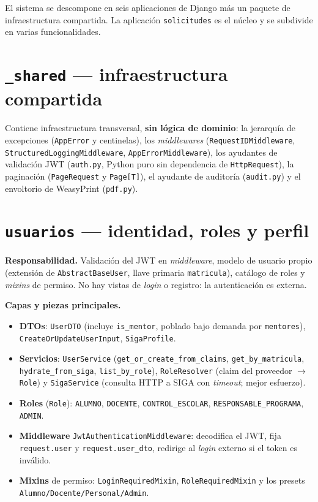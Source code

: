 \documentclass[12pt,letterpaper]{report}
\begin{document}
El sistema se descompone en seis aplicaciones de Django más un paquete de
infraestructura compartida. La aplicación \texttt{solicitudes} es el núcleo y se
subdivide en varias funcionalidades.

\section{\texttt{\_shared} — infraestructura compartida}

Contiene infraestructura transversal, \textbf{sin lógica de dominio}: la
jerarquía de excepciones (\texttt{AppError} y centinelas), los \textit{middlewares}
(\texttt{RequestIDMiddleware}, \texttt{StructuredLoggingMiddleware},
\texttt{AppErrorMiddleware}), los ayudantes de validación JWT (\texttt{auth.py},
Python puro sin dependencia de \texttt{HttpRequest}), la paginación
(\texttt{PageRequest} y \texttt{Page[T]}), el ayudante de auditoría
(\texttt{audit.py}) y el envoltorio de WeasyPrint (\texttt{pdf.py}).

\section{\texttt{usuarios} — identidad, roles y perfil}

\textbf{Responsabilidad.} Validación del JWT en \textit{middleware}, modelo de
usuario propio (extensión de \texttt{AbstractBaseUser}, llave primaria
\texttt{matricula}), catálogo de roles y \textit{mixins} de permiso. No hay
vistas de \textit{login} o registro: la autenticación es externa.

\textbf{Capas y piezas principales.}
\begin{itemize}[leftmargin=1.4em]
  \item \textbf{DTOs}: \texttt{UserDTO} (incluye \texttt{is\_mentor}, poblado bajo
  demanda por \texttt{mentores}), \texttt{CreateOrUpdateUserInput},
  \texttt{SigaProfile}.
  \item \textbf{Servicios}: \texttt{UserService}
  (\texttt{get\_or\_create\_from\_claims}, \texttt{get\_by\_matricula},
  \texttt{hydrate\_from\_siga}, \texttt{list\_by\_role}), \texttt{RoleResolver}
  (claim del proveedor $\rightarrow$ \texttt{Role}) y \texttt{SigaService}
  (consulta HTTP a SIGA con \textit{timeout}; mejor esfuerzo).
  \item \textbf{Roles} (\texttt{Role}): \texttt{ALUMNO}, \texttt{DOCENTE},
  \texttt{CONTROL\_ESCOLAR}, \texttt{RESPONSABLE\_PROGRAMA}, \texttt{ADMIN}.
  \item \textbf{Middleware} \texttt{JwtAuthenticationMiddleware}: decodifica el
  JWT, fija \texttt{request.user} y \texttt{request.user\_dto}, redirige al
  \textit{login} externo si el token es inválido.
  \item \textbf{Mixins} de permiso: \texttt{LoginRequiredMixin},
  \texttt{RoleRequiredMixin} y los presets \texttt{Alumno/Docente/Personal/Admin}.
\end{itemize}
\end{document}
